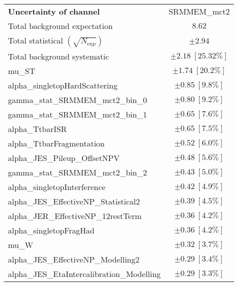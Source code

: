 
\begin{table}
\begin{center}
\setlength{\tabcolsep}{0.0pc}
\begin{tabular*}{\textwidth}{@{\extracolsep{\fill}}lc}
\noalign{\smallskip}\hline\noalign{\smallskip}
{\textbf{Uncertainty of channel}}                                    & SRMMEM\_mct2            \\
\noalign{\smallskip}\hline\noalign{\smallskip}
Total background expectation             &  $8.62$       \\
\noalign{\smallskip}\hline\noalign{\smallskip}
Total statistical $(\sqrt{N_{\mathrm{exp}}})$              & $\pm 2.94$       \\
Total background systematic               & $\pm 2.18\ [25.32\%] $             \\
\noalign{\smallskip}\hline\noalign{\smallskip}
\noalign{\smallskip}\hline\noalign{\smallskip}
mu\_ST         & $\pm 1.74\ [20.2\%] $       \\
alpha\_singletopHardScattering         & $\pm 0.85\ [9.8\%] $       \\
gamma\_stat\_SRMMEM\_mct2\_bin\_0         & $\pm 0.80\ [9.2\%] $       \\
gamma\_stat\_SRMMEM\_mct2\_bin\_1         & $\pm 0.65\ [7.6\%] $       \\
alpha\_TtbarISR         & $\pm 0.65\ [7.5\%] $       \\
alpha\_TtbarFragmentation         & $\pm 0.52\ [6.0\%] $       \\
alpha\_JES\_Pileup\_OffsetNPV         & $\pm 0.48\ [5.6\%] $       \\
gamma\_stat\_SRMMEM\_mct2\_bin\_2         & $\pm 0.43\ [5.0\%] $       \\
alpha\_singletopInterference         & $\pm 0.42\ [4.9\%] $       \\
alpha\_JES\_EffectiveNP\_Statistical2         & $\pm 0.39\ [4.5\%] $       \\
alpha\_JER\_EffectiveNP\_12restTerm         & $\pm 0.36\ [4.2\%] $       \\
alpha\_singletopFragHad         & $\pm 0.36\ [4.2\%] $       \\
mu\_W         & $\pm 0.32\ [3.7\%] $       \\
alpha\_JES\_EffectiveNP\_Modelling2         & $\pm 0.29\ [3.4\%] $       \\
alpha\_JES\_EtaIntercalibration\_Modelling         & $\pm 0.29\ [3.3\%] $       \\

\end{tabular*}
\end{center}
\end{table}
